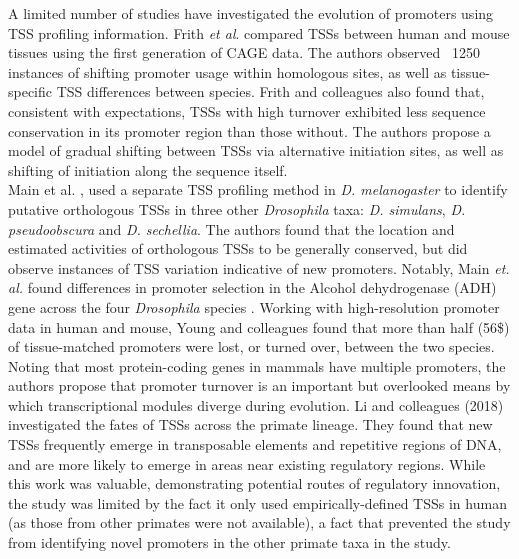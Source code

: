 \documentclass[nogrid]{MBE}%
\begin{document}
A limited number of studies have investigated the evolution of promoters using TSS profiling information. Frith \textit{et al}. \citep{Frith:2006bb} compared TSSs between human and mouse tissues using the first generation of CAGE data. The authors observed ~1250 instances of shifting promoter usage within homologous sites, as well as tissue-specific TSS differences between species. Frith and colleagues also found that, consistent with expectations, TSSs with high turnover exhibited less sequence conservation in its promoter region than those without. The authors propose a model of gradual shifting between TSSs via alternative initiation sites, as well as shifting of initiation along the sequence itself. \\

Main et al. \citep{Main:2013dg}, used a separate TSS profiling method in \textit{D. melanogaster} to identify putative orthologous TSSs in three other \textit{Drosophila} taxa: \textit{D. simulans}, \textit{D. pseudoobscura} and \textit{D. sechellia}. The authors found that the location and estimated activities of orthologous TSSs to be generally conserved, but did observe instances of TSS variation indicative of new promoters. Notably, Main \textit{et. al.} found differences in promoter selection in the Alcohol dehydrogenase (ADH) gene across the four \textit{Drosophila} species \citep{Main:2013dg}. Working with high-resolution promoter data in human and mouse, Young and colleagues \citep{Young:2015xx} found that more than half (56\$) of tissue-matched promoters were lost, or turned over, between the two species. Noting that most protein-coding genes in mammals \citep{FANTOMConsortiumandtheRIKENPMIandCLSTDGT:2014hz} have multiple promoters, the authors propose that promoter turnover is an important but overlooked means by which transcriptional modules diverge during evolution. Li and colleagues (2018) investigated the fates of TSSs across  the primate lineage. They found that new TSSs frequently emerge in transposable elements and repetitive regions of DNA, and are more likely to emerge in areas near existing regulatory regions. While this work was valuable, demonstrating potential routes of regulatory innovation, the study was limited by the fact it only used empirically-defined TSSs in human (as those from other primates were not available), a fact that prevented the study from identifying novel promoters in the other primate taxa in the study. \\ 
\end{document}
